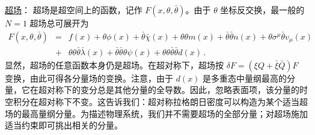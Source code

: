 \noindent\underline{超场}：
\noindent 超场是超空间上的函数，记作
$F(x,\theta,\bar\theta)$。由于 $\theta$ 坐标反交换，最一般的 $N=1$ 超场总可展开为
\begin{eqnarray}
F(x,\theta,\bar\theta)&=& f(x)+\theta\phi(x) + \bar\theta\bar\chi(x)
+\theta\theta m(x) +\bar\theta\bar\theta n(x) + 
\theta\sigma^\mu\bar\theta v_\mu (x) \nonumber\\
&+&\theta\theta\bar\theta\bar\lambda(x)+\bar\theta\bar\theta\theta\psi(x)
+ \theta\theta\bar\theta\bar\theta d(x)\,. 
\label{superfield}
\end{eqnarray}
显然，超场的任意函数本身仍是超场。在超对称下，超场按 $\delta F=(\xi
Q+\bar\xi\bar Q)F$ 变换，由此可得各分量场的变换。注意，由于 $d(x)$ 是多重态中量纲最高的分量，它在超对称下的变分总是其他分量的全导数。因此，忽略表面项，该分量的时空积分在超对称下不变。这告诉我们：超对称拉格朗日密度可以构造为某个适当超场的最高量纲分量。为描述物理系统，我们并不需要超场的全部分量；对超场施加适当约束即可挑出相关的分量。


